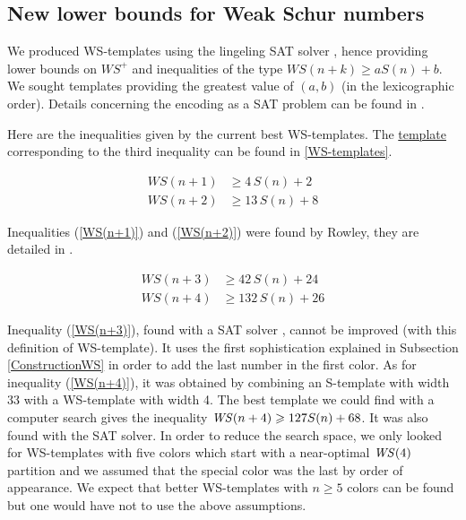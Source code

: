 \subsection{New lower bounds for Weak Schur numbers}

We produced WS-templates using the lingeling SAT solver \cite{Lingeling2017}, hence providing lower bounds on \(WS^+\) 
and inequalities of the type \(WS(n+k) \geqslant a S(n) + b\). We sought templates providing the greatest value of \((a, b)\) 
(in the lexicographic order). Details concerning the encoding as a SAT problem can be found in \cite{Heule2017}.

\par
Here are the inequalities given by the current best WS-templates. The \hyperref[WS-templates]{template} 
corresponding to the third inequality can be found in \ref{WS-templates}.

\begin{align}
	WS(n + 1) &\geqslant  4\,S(n)  +  2 \label{WS(n+1)} \\
	WS(n + 2) &\geqslant  13\,S(n)  +  8 \label{WS(n+2)} 
\end{align}

Inequalities (\ref{WS(n+1)}) and (\ref{WS(n+2)}) were found by Rowley, they are detailed in \cite{RowleyWS}.

\begin{align}
	WS(n + 3) &\geqslant  42\,S(n)  +  24 \label{WS(n+3)} \\
	WS(n + 4) &\geqslant  132\,S(n)  +  26 \label{WS(n+4)}
\end{align}

Inequality (\ref{WS(n+3)}), found with a SAT solver \cite{Lingeling2017}, cannot be improved (with this 
definition of WS-template). It uses the first 
sophistication explained in Subsection \ref{ConstructionWS} in order to add
the last number in the first color. As for inequality (\ref{WS(n+4)}), it was obtained by combining an S-template with 
width 33 with a WS-template with width 4. The best template we could find with a computer search gives the 
inequality \(\mathit{WS}(n+4) \geqslant 127 S(n) + 68\). It was also found with the SAT solver. In order to reduce the search space, 
we only looked for WS-templates with five colors which start with a near-optimal \(\mathit{WS}(4)\) partition and we assumed that the 
special color was the last by order of appearance. We expect that better WS-templates with \(n \geqslant 5\) 
colors can be found but one would have not to use the above assumptions.

